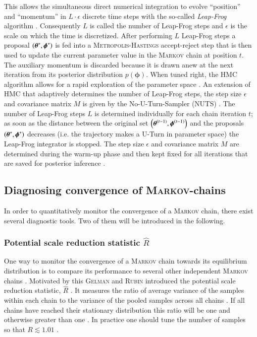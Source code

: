 This allows the simultaneous direct numerical integration to evolve \enquote{position} and \enquote{momentum} in $L\cdot\epsilon$ discrete time steps with the so-called \emph{Leap-Frog} algorithm \cite{leapfrog}. Consequently $L$ is called the number of Leap-Frog steps and $\epsilon$ is the scale on which the time is discretized. After performing $L$ Leap-Frog steps a proposal $\left(\boldsymbol{\theta}^*,\boldsymbol{\phi}^*\right)$ is fed into a \textsc{Metropolis-Hastings} accept-reject step that is then used to update the current parameter value in the \textsc{Markov} chain at position $t$. The auxiliary momentum is discarded because it is drawn anew at the next iteration from its posterior distribution $p(\boldsymbol{\phi})$. When tuned right, the HMC algorithm allows for a rapid exploration of the parameter space \cite{bayes}. An extension of HMC that adaptively determines the number of Leap-Frog steps, the step size $\epsilon$ and covariance matrix $M$ is given by the No-U-Turn-Sampler (NUTS) \cite{nuts}. The number of Leap-Frog steps $L$ is determined individually for each chain iteration $t$; as soon as the distance between the original set $\left(\boldsymbol{\theta}^{(t-1)},\boldsymbol{\phi}^{(t-1)}\right)$ and the proposals $\left(\boldsymbol{\theta}^*,\boldsymbol{\phi}^*\right)$ decreases (i.e. the trajectory makes a U-Turn in parameter space) the Leap-Frog integrator is stopped. The step size $\epsilon$ and covariance matrix $M$ are determined during the warm-up phase and then kept fixed for all iterations that are saved for posterior inference \cite{bayes}.
\subsection{Diagnosing convergence of \textsc{Markov}-chains}
In order to quantitatively monitor the convergence of a \textsc{Markov} chain, there exist several diagnostic tools. Two of them will be introduced in the following. 
\subsubsection{Potential scale reduction statistic $\widehat{R}$}
One way to monitor the convergence of a \textsc{Markov} chain towards its equilibrium distribution is to compare its performance to several other independent \textsc{Markov} chains \cite{stan}. Motivated by this \textsc{Gelman} and \textsc{Rubin} introduced the potential scale reduction statistic, $\widehat{R}$ \cite{rhatorig}. It measures the ratio of average variance of the samples within each chain to the variance of the pooled samples across all chains \cite{stan}. If all chains have reached their stationary distribution this ratio will be one and otherwise greater than one \cite{stan}. In practice one should tune the number of samples so that $R\lesssim1.01$ \cite{rhat}. 

